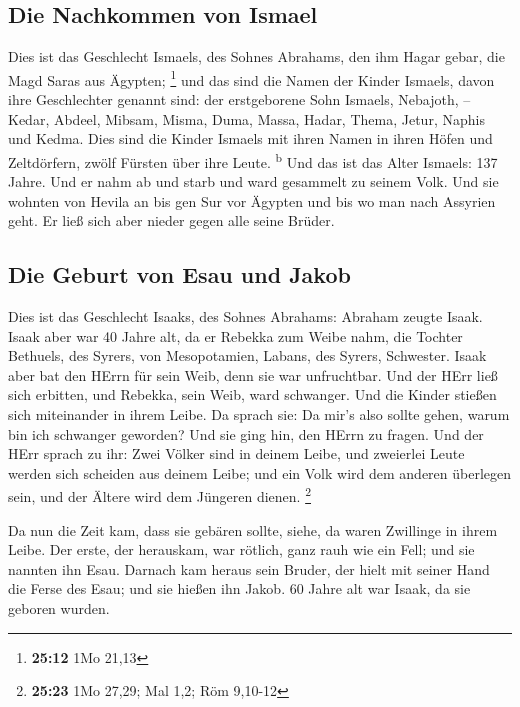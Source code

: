 \hypertarget{die-nachkommen-von-ismael}{%
\subsection{Die Nachkommen von Ismael}\label{die-nachkommen-von-ismael}}

 Dies ist das Geschlecht Ismaels, des Sohnes Abrahams,
den ihm Hagar gebar, die Magd Saras aus Ägypten; \footnote{\textbf{25:12}
  1Mo 21,13}  und das sind die Namen der Kinder Ismaels,
davon ihre Geschlechter genannt sind: der erstgeborene Sohn Ismaels,
Nebajoth, -- Kedar, Abdeel, Mibsam,  Misma, Duma, Massa,
 Hadar, Thema, Jetur, Naphis und Kedma. 
Dies sind die Kinder Ismaels mit ihren Namen in ihren Höfen und
Zeltdörfern, zwölf Fürsten über ihre Leute. \textsuperscript{b}
 Und das ist das Alter Ismaels: 137 Jahre. Und er nahm ab
und starb und ward gesammelt zu seinem Volk.  Und sie
wohnten von Hevila an bis gen Sur vor Ägypten und bis wo man nach
Assyrien geht. Er ließ sich aber nieder gegen alle seine Brüder.

\hypertarget{die-geburt-von-esau-und-jakob}{%
\subsection{Die Geburt von Esau und
Jakob}\label{die-geburt-von-esau-und-jakob}}

 Dies ist das Geschlecht Isaaks, des Sohnes Abrahams:
Abraham zeugte Isaak.  Isaak aber war 40 Jahre alt, da er
Rebekka zum Weibe nahm, die Tochter Bethuels, des Syrers, von
Mesopotamien, Labans, des Syrers, Schwester.  Isaak aber
bat den HErrn für sein Weib, denn sie war unfruchtbar. Und der HErr ließ
sich erbitten, und Rebekka, sein Weib, ward schwanger. 
Und die Kinder stießen sich miteinander in ihrem Leibe. Da sprach sie:
Da mir's also sollte gehen, warum bin ich schwanger geworden? Und sie
ging hin, den HErrn zu fragen.  Und der HErr sprach zu
ihr: Zwei Völker sind in deinem Leibe, und zweierlei Leute werden sich
scheiden aus deinem Leibe; und ein Volk wird dem anderen überlegen sein,
und der Ältere wird dem Jüngeren dienen. \footnote{\textbf{25:23} 1Mo
  27,29; Mal 1,2; Röm 9,10-12}

 Da nun die Zeit kam, dass sie gebären sollte, siehe, da
waren Zwillinge in ihrem Leibe.  Der erste, der
herauskam, war rötlich, ganz rauh wie ein Fell; und sie nannten ihn
Esau.  Darnach kam heraus sein Bruder, der hielt mit
seiner Hand die Ferse des Esau; und sie hießen ihn Jakob. 60 Jahre alt
war Isaak, da sie geboren wurden.

